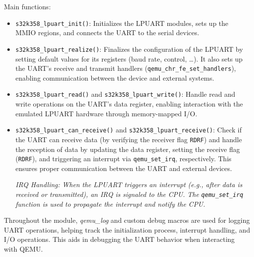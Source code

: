 Main functions:
\begin{itemize}
    \item \texttt{s32k358\_lpuart\_init()}: Initializes the LPUART modules, sets up the MMIO regions, and connects the UART to the serial devices.
    \item \texttt{s32k358\_lpuart\_realize()}: Finalizes the configuration of the LPUART by setting default values for its registers (baud rate, control, \dots). It also sets up the UART's receive and transmit handlers (\texttt{qemu\_chr\_fe\_set\_handlers}), enabling communication between the device and external systems.
    \item \texttt{s32k358\_lpuart\_read()} and \texttt{s32k358\_lpuart\_write()}: Handle read and write operations on the UART's data register, enabling interaction with the emulated LPUART hardware through memory-mapped I/O.
    \item \texttt{s32k358\_lpuart\_can\_receive()} and \texttt{s32k358\_lpuart\_receive()}: Check if the UART can receive data (by verifying the receiver flag \texttt{RDRF}) and handle the reception of data by updating the data register, setting the receive flag (\texttt{RDRF}), and triggering an interrupt via \texttt{qemu\_set\_irq}, respectively. This ensures proper communication between the UART and external devices.
    \begin{center}
        \textit{IRQ Handling: When the LPUART triggers an interrupt (e.g., after data is received or transmitted), an IRQ is signaled to the CPU. The \texttt{qemu\_set\_irq} function is used to propagate the interrupt and notify the CPU.}
    \end{center}
\end{itemize}
\noindent Throughout the module, \textit{qemu\_log} and custom debug macros are used for logging UART operations, helping track the initialization process, interrupt handling, and I/O operations. This aids in debugging the UART behavior when interacting with QEMU.

